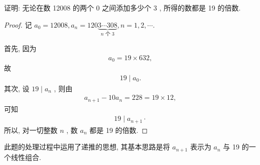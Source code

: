 \begin{example}
	证明: 无论在数 12008 的两个 0 之间添加多少个 3 , 所得的数都是 19 的倍数.
\end{example}
\begin{proof}
	记 $a_{0}=12008, a_{n}=120 \underbrace{3 \cdots 308}_{n \text { 个 } 3}, n=1,2, \cdots$.

	首先, 因为
	\begin{align*}
		a_{0}=19 \times 632,
	\end{align*}
	故
	\begin{align*}
		19 \mid a_{0}.
	\end{align*}
	其次, 设 $19 \mid a_{n}$ , 则由
	\begin{align*}
		a_{n+1}-10 a_{n}=228=19 \times 12,
	\end{align*}
	可知
	\begin{align*}
		19 \mid a_{n+1} \cdot
	\end{align*}
	所以, 对一切整数 $n$ , 数 $a_{n}$ 都是 19 的倍数.
\end{proof}
\begin{note}
	此题的处理过程中运用了递推的思想, 其基本思路是将 $a_{n+1}$ 表示为 $a_{n}$ 与 19 的一个线性组合.
\end{note}


